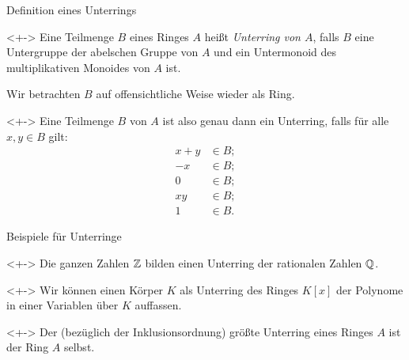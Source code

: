 \begin{frame}{Definition eines Unterrings}
    \begin{definition}<+->
        Eine Teilmenge \(B\) eines Ringes \(A\) heißt \emph{Unterring von
        \(A\)}, falls \(B\) eine Untergruppe der abelschen Gruppe von \(A\)
        und ein Untermonoid des multiplikativen Monoides von \(A\) ist.
    \end{definition}
    Wir betrachten \(B\) auf offensichtliche Weise wieder als Ring.
    \\
    \begin{visibleenv}<+->
        Eine Teilmenge \(B\) von \(A\) ist also genau dann ein Unterring,
        falls für alle \(x, y \in B\) gilt:
        \begin{align*}
            x + y & \in B; \\
            -x & \in B; \\
            0 & \in B; \\
            x y & \in B; \\
            1 & \in B.
        \end{align*}
    \end{visibleenv}
\end{frame}

\begin{frame}{Beispiele für Unterringe}
    \begin{example}<+->
        Die ganzen Zahlen \(\mathbb Z\) bilden einen Unterring der rationalen Zahlen
        \(\mathbb Q\).
    \end{example}
    \begin{example}<+->
        Wir können einen Körper \(K\) als Unterring des Ringes \(K[x]\) der Polynome
        in einer Variablen über \(K\) auffassen.
    \end{example}
    \begin{example}<+->
        Der (bezüglich der Inklusionsordnung) größte Unterring eines Ringes \(A\)
        ist der Ring \(A\) selbst.
    \end{example}
\end{frame}

